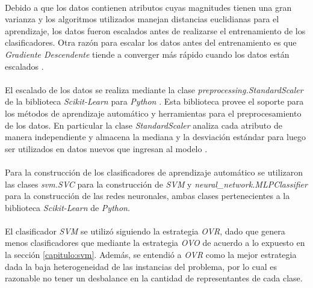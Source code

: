 \paragraph{} Debido a que los datos contienen atributos cuyas magnitudes tienen una gran varianza y los algoritmos utilizados manejan distancias euclidianas para el aprendizaje, los datos fueron escalados antes de realizarse el entrenamiento de los clasificadores.
Otra razón para escalar los datos antes del entrenamiento es que \textit{Gradiente Descendente} tiende a converger más rápido cuando los datos están escalados \cite{gradiente-descendente-escalado}.

\paragraph{} El escalado de los datos se realiza mediante la clase \textit{preprocessing.StandardScaler} de la biblioteca \textit{Scikit-Learn} para \textit{Python} \cite{scikit-learn}.
Esta biblioteca provee el soporte para los métodos de aprendizaje automático y herramientas para el preprocesamiento de los datos.
En particular la clase \textit{StandardScaler} analiza cada atributo de manera independiente y almacena la mediana y la desviación estándar para luego ser utilizados en datos nuevos que ingresan al modelo \cite{StandardScaler-scikit-learn}.

\paragraph{} Para la construcción de los clasificadores de aprendizaje automático se utilizaron las clases \textit{svm.SVC} para la construcción de \textit{SVM} y \textit{neural\_network.MLPClassifier} para la construcción de las redes neuronales, ambas clases pertenecientes a la biblioteca \textit{Scikit-Learn} de \textit{Python}.

\paragraph{} El clasificador \textit{SVM} se utilizó siguiendo la estrategia \textit{OVR}, dado que genera menos clasificadores que mediante la estrategia \textit{OVO} de acuerdo a lo expuesto en la sección \ref{capitulo:svm}.
Además, se entendió a \textit{OVR} como la mejor estrategia dada la baja heterogeneidad de las instancias del problema, por lo cual es razonable no tener un desbalance en la cantidad de representantes de cada clase.


